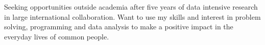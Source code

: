 

\begin{cvparagraph}

Seeking opportunities outside academia after five years of data intensive research in large international collaboration. 
Want to use my skills and interest in problem solving, programming and data analysis to make a positive impact in the everyday lives of common people. 

\end{cvparagraph}